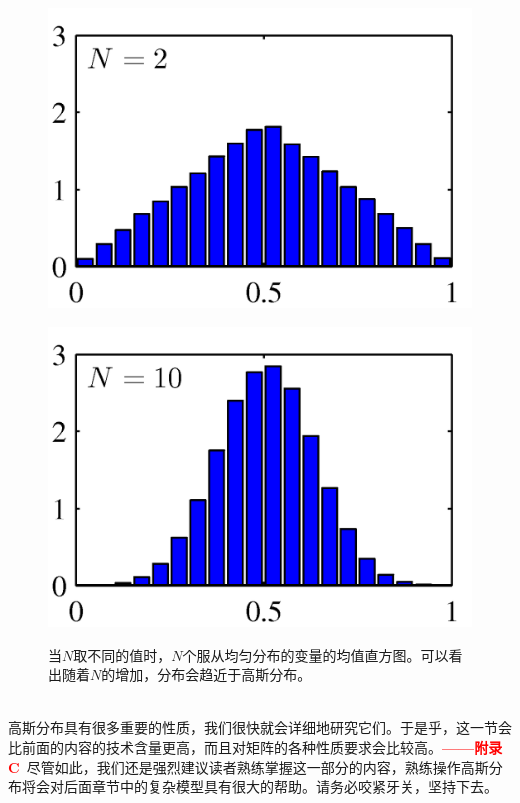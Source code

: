 \documentclass[b5paper]{book}
\numberwithin{equation}{chapter}
\begin{document}
{\begin{figure}[ht]
\begin{minipage}[t]{0.3\linewidth}
		\label{fig:2-6a}
		\end{minipage}
		\begin{minipage}[t]{0.3\linewidth}
		\centering
		\includegraphics[scale=0.8]{Images/2-6b.png}
		\label{fig:2-6b}
		\end{minipage}
		\begin{minipage}[t]{0.3\linewidth}
		\centering
		\includegraphics[scale=0.8]{Images/2-6c.png}
		\label{fig:2-6c}
		\end{minipage}
		\caption{当$N$取不同的值时，$N$个服从均匀分布的变量的均值直方图。可以看出随着$N$的增加，分布会趋近于高斯分布。}
	\end{figure}
	\\
	\indent 高斯分布具有很多重要的性质，我们很快就会详细地研究它们。于是乎，这一节会比前面的内容的技术含量更高，而且对矩阵的各种性质要求会比较高。\textcolor{red}{\textbf{——附录 C}}\ 尽管如此，我们还是强烈建议读者熟练掌握这一部分的内容，熟练操作高斯分布将会对后面章节中的复杂模型具有很大的帮助。请务必咬紧牙关，坚持下去。\\
}
\end{document}
